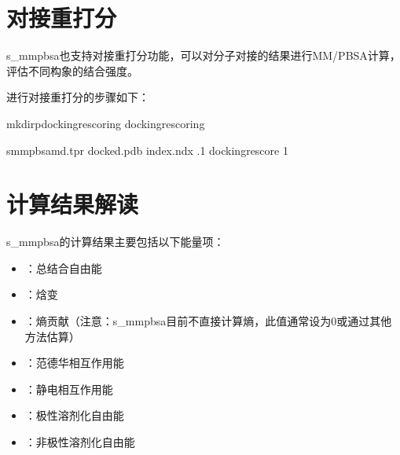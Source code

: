 \documentclass[letterpaper,10pt,english]{sphinxmanual}
\begin{document}
\section{对接重打分}
\label{\detokenize{usage:id10}}
\sphinxAtStartPar
s\_mmpbsa也支持对接重打分功能，可以对分子对接的结果进行MM/PB\sphinxhyphen{}SA计算，评估不同构象的结合强度。

\sphinxAtStartPar
进行对接重打分的步骤如下：

\begin{sphinxVerbatim}[commandchars=\\\{\}]
mkdir\PYGZhy{}pdocking\PYGZus{}rescoring
docking\PYGZus{}rescoring


s\PYGZus{}mmpbsamd.tpr
docked.pdb
index.ndx
.1
docking\PYGZus{}rescore
\PYGZhy{}1
\end{sphinxVerbatim}


\section{计算结果解读}
\label{\detokenize{usage:id11}}
\sphinxAtStartPar
s\_mmpbsa的计算结果主要包括以下能量项：
\begin{itemize}
\item {} 
\sphinxAtStartPar
{}：总结合自由能

\item {} 
\sphinxAtStartPar
{}：焓变

\item {} 
\sphinxAtStartPar
{}：熵贡献（注意：s\_mmpbsa目前不直接计算熵，此值通常设为0或通过其他方法估算）

\item {} 
\sphinxAtStartPar
{}：范德华相互作用能

\item {} 
\sphinxAtStartPar
{}：静电相互作用能

\item {} 
\sphinxAtStartPar
{}：极性溶剂化自由能

\item {} 
\sphinxAtStartPar
{}：非极性溶剂化自由能

\end{itemize}
\end{document}

